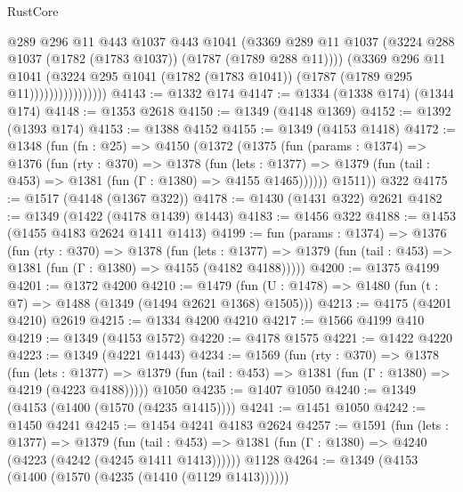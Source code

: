 \begin{lexlean}{RustCore}
\begin{coremodule}
                            @289
                            @296
                            @11
                            @443
                            @1037
                            @443
                            @1041
                            (@3369
                              @289
                              @11
                              @1037
                              (@3224 @288 @1037 (@1782 (@1783 @1037)) (@1787 (@1789 @288 @11))))
                            (@3369
                              @296
                              @11
                              @1041
                              (@3224
                                @295
                                @1041
                                (@1782 (@1783 @1041))
                                (@1787 (@1789 @295 @11))))))))))))))))
@4143 := @1332 @174
@4147 := @1334 (@1338 @174) (@1344 @174)
@4148 := @1353 @2618
@4150 := @1349 (@4148 @1369)
@4152 := @1392 (@1393 @174)
@4153 := @1388 @4152
@4155 := @1349 (@4153 @1418)
@4172 := @1348
    (fun (fn : @25) =>
    @4150
      (@1372
        (@1375
          (fun (params : @1374) =>
          @1376
            (fun (rty : @370) =>
            @1378
              (fun (lets : @1377) =>
              @1379 (fun (tail : @453) => @1381 (fun (Γ : @1380) => @4155 @1465))))))
        @1511))
    @322
@4175 := @1517 (@4148 (@1367 @322))
@4178 := @1430 (@1431 @322) @2621
@4182 := @1349 (@1422 (@4178 @1439) @1443)
@4183 := @1456 @322
@4188 := @1453 (@1455 @4183 @2624 @1411 @1413)
@4199 := fun (params : @1374) =>
  @1376
    (fun (rty : @370) =>
    @1378
      (fun (lets : @1377) =>
      @1379 (fun (tail : @453) => @1381 (fun (Γ : @1380) => @4155 (@4182 @4188)))))
@4200 := @1375 @4199
@4201 := @1372 @4200
@4210 := @1479 (fun (U : @1478) => @1480 (fun (t : @7) => @1488 (@1349 (@1494 @2621 @1368) @1505)))
@4213 := @4175 (@4201 @4210) @2619
@4215 := @1334 @4200 @4210
@4217 := @1566 @4199 @410
@4219 := @1349 (@4153 @1572)
@4220 := @4178 @1575
@4221 := @1422 @4220
@4223 := @1349 (@4221 @1443)
@4234 := @1569
    (fun (rty : @370) =>
    @1378
      (fun (lets : @1377) =>
      @1379 (fun (tail : @453) => @1381 (fun (Γ : @1380) => @4219 (@4223 @4188)))))
    @1050
@4235 := @1407 @1050
@4240 := @1349 (@4153 (@1400 (@1570 (@4235 @1415))))
@4241 := @1451 @1050
@4242 := @1450 @4241
@4245 := @1454 @4241 @4183 @2624
@4257 := @1591
    (fun (lets : @1377) =>
    @1379
      (fun (tail : @453) => @1381 (fun (Γ : @1380) => @4240 (@4223 (@4242 (@4245 @1411 @1413))))))
    @1128
@4264 := @1349 (@4153 (@1400 (@1570 (@4235 (@1410 (@1129 @1413))))))

\end{coremodule}
\end{lexlean}
